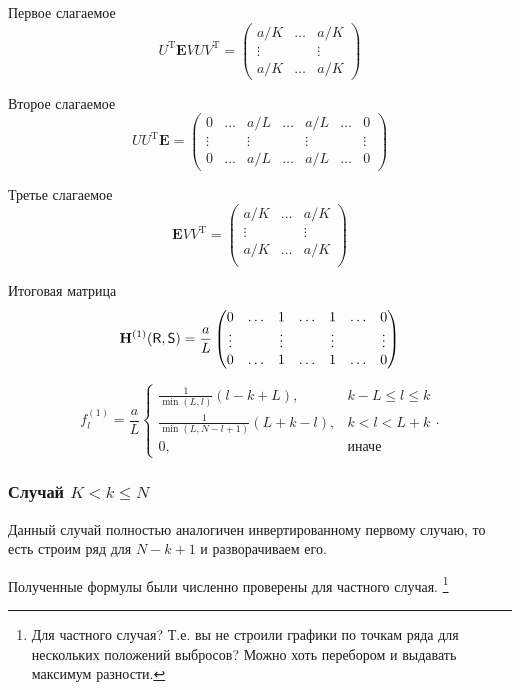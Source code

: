 \documentclass[specialist,
               substylefile = spbu.rtx,
               subf,href,colorlinks=true, 12pt]{disser}
\begin{document}
Первое слагаемое
$$U^{\mathrm{T}} \mathbf{E} V U V^{\mathrm{T}} = \begin{pmatrix}
	a/ K & \ldots &   a/ K\\
	\vdots & & \vdots\\
	a/ K &   \ldots &   a/ K
\end{pmatrix}$$

Второе слагаемое
$$U U^{\mathrm{T}} \mathbf{E} = \begin{pmatrix}
	0 & \ldots & a/L & \ldots & a/L & \ldots & 0\\
	\vdots & & \vdots & & \vdots & & \vdots\\
	0 & \ldots & a/L & \ldots & a/L & \ldots & 0
\end{pmatrix}$$

Третье слагаемое
$$\mathbf{E} V V^{\mathrm{T}} = \begin{pmatrix}
	a/K &  \ldots & a/K\\
	\vdots & & \vdots\\
	a/K &  \ldots & a/K\\
\end{pmatrix}$$

Итоговая матрица
$$\mathbf{H}^{(1)}(\textsf{R}, \textsf{S}) = \frac{a}{L}\begin{pmatrix}
	0 & \ldots & 1 & \ldots & 1 & \ldots & 0\\
	\vdots & & \vdots & & \vdots & & \vdots\\
	0 & \ldots & 1 & \ldots & 1 & \ldots & 0
\end{pmatrix}$$

$$f^{(1)}_l = \frac{a}{{L}}
\begin{cases}
	\frac{1}{\min(L, l)}(l - k + L), & \text{$k - L \leq l \leq k$}\\
	\frac{1}{\min(L, N - l + 1)}(L + k - l), & \text{$k < l < L + k$}\\
	0, & \text{иначе}
\end{cases}.$$


\subsubsection{Случай $K < k \leq N$}
Данный случай полностью аналогичен инвертированному первому случаю, то есть строим ряд для $N - k + 1$ и разворачиваем его.

\vspace{1em}
Полученные формулы были численно проверены для частного случая.
\footnote{Для частного случая? Т.е. вы не строили графики по точкам ряда для нескольких положений выбросов? Можно хоть перебором и выдавать максимум разности.}
\end{document}
